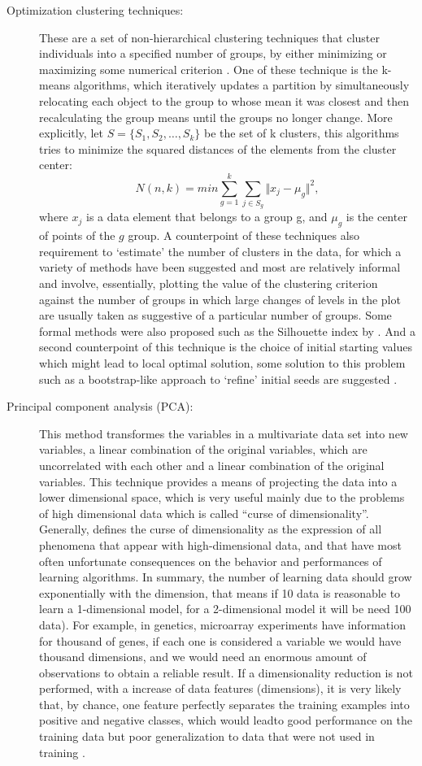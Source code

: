 \begin{description}
\item[Optimization clustering
techniques:]{
These are a set of non-hierarchical clustering techniques that cluster individuals into a specified number of groups, by either minimizing or maximizing some numerical criterion \cite{everitt2011hierarchical}.  One of these technique is the k-means algorithms, which iteratively updates a partition by simultaneously relocating each object to the group to whose mean it was closest and then recalculating the group means until the groups no longer change.
More explicitly, let $S = \{S_1,S_2,\ldots,S_k\}$  be the set of k clusters, this algorithms tries to minimize the squared distances of the elements from the cluster center:
$$ N(n,k) = min\sum_{g = 1}^{k}\sum_{j \in S_g}\Vert x_j - \mu_g\Vert^2,$$
where $x_j$ is a data element that belongs to a group g, and $\mu_g$ is the center of points of the $g$ group. A counterpoint of these techniques also requirement to ‘estimate’ the number of clusters in the data, for which a variety of methods
have been suggested and  most are
relatively informal and involve, essentially, plotting the value of the clustering
criterion against the number of groups in which large changes of levels in the plot are
usually taken as suggestive of a particular number of groups.
Some formal methods were also proposed such as the Silhouette index by .
And a second counterpoint of this technique is the choice of initial starting values which might lead to local optimal solution, some solution to this problem such as a  bootstrap-like approach to ‘refine’ initial seeds are suggested \cite{steinley2003local}.
}
\item[Principal component analysis (PCA):]{
This method transformes the variables in a multivariate data set into new variables, a linear combination of the original variables, which are uncorrelated with each other and a linear combination of the original variables. This technique provides a means of
projecting the data into a lower dimensional space, which is very useful  mainly due to the problems of high dimensional data which is called ``curse of dimensionality''.
Generally,  defines the curse of dimensionality as the expression of all phenomena that appear with high-dimensional data, and that have most often unfortunate consequences on the behavior and performances of learning algorithms. In summary,  the number of learning data should grow exponentially with
the dimension, that means if 10 data  is reasonable to learn a 1-dimensional model, for a 2-dimensional model it will be need 100 data). For example, in genetics, microarray experiments have information for thousand of genes, if each one is considered a variable we would have thousand dimensions,
and we would need an enormous amount of observations to obtain a reliable result. If a dimensionality reduction is not performed, with a increase of data features (dimensions), it is very likely that, by chance, one feature perfectly separates the training examples into positive and negative classes, which would leadto good performance on the training data but poor generalization to data that were not used in training \cite{libbrecht2015machine}.
}
\end{description}

